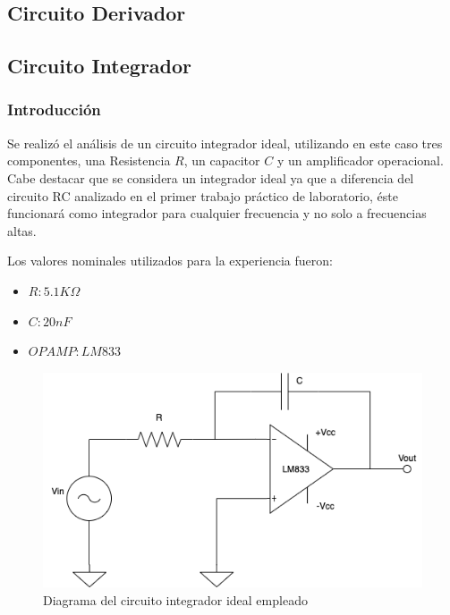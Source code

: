 \subsection{Circuito Derivador}



\subsection{Circuito Integrador}

\subsubsection{Introducción}

Se realizó el análisis de un circuito integrador ideal, utilizando en este caso tres componentes, una Resistencia $R$,
un capacitor $C$ y un amplificador operacional. 
Cabe destacar que se considera un integrador ideal ya que a diferencia del circuito RC analizado en el primer trabajo práctico de laboratorio,
éste funcionará como integrador para cualquier frecuencia y no solo a frecuencias altas. 

Los valores nominales utilizados para la experiencia fueron:

\begin{itemize}
	\item $R: 5.1K \Omega$ 
	\item $C: 20nF$
	\item $OPAMP: LM833$
\end{itemize}

\begin{figure}[H]
    \centering 
    \includegraphics [scale=0.5] {../Ejercicio3-CircuitoIntegradoresyDerivadores/Imagenes/diagrama-integrador.png} 
    \caption{Diagrama del circuito integrador ideal empleado}
    \label{fig:emptyPlotTool}
\end{figure}

